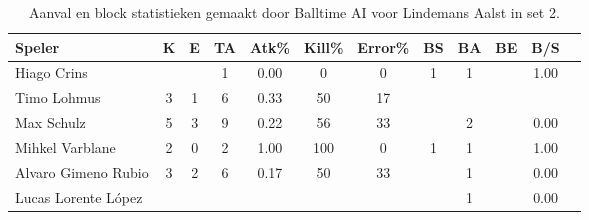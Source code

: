 \begin{table}[ht!]
  \centering
  \scriptsize
  \begin{tabular}{|l|c|c|c|c|c|c|c|c|c|c|c|} \hline
    \textbf{Speler} & K & E & TA & Atk\% & Kill\%  & Error\% & BS & BA & BE & B/S \\ \hline
    Hiago Crins & & & 1 & 0.00 & 0  & 0 & 1 & 1 & & 1.00 \\
    Timo Lohmus & 3 & 1 & 6 & 0.33 & 50  & 17 &  &  & & \\
    Max Schulz & 5 & 3 & 9 & 0.22 & 56  & 33 &  & 2 & & 0.00 \\
    Mihkel Varblane & 2 & 0 & 2 & 1.00 & 100  & 0 & 1 & 1 & & 1.00 \\
    Alvaro Gimeno Rubio & 3 & 2 & 6 & 0.17 & 50  & 33 &  & 1 & & 0.00\\
    Lucas Lorente López &  &  &  &  &  &  &  & 1 & & 0.00 \\ \hline
  \end{tabular}
  \caption[Aanval en blokstatistieken gemaakt door Balltime AI voor Lindemans Aalst in set 2]{\label{tab:PL1AttBlockAalstAI2}Aanval en block statistieken gemaakt door Balltime AI voor Lindemans Aalst in set 2.}
\end{table}
